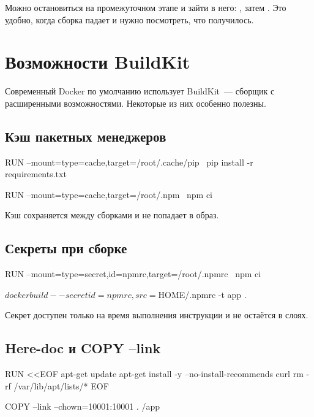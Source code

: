\begin{tipbox}
Можно остановиться на промежуточном этапе и зайти в него:
, затем
. Это удобно, когда сборка падает
и нужно посмотреть, что получилось.
\end{tipbox}

\section{Возможности BuildKit}

Современный Docker по умолчанию использует BuildKit~--- сборщик
с расширенными возможностями. Некоторые из них особенно полезны.

\subsection{Кэш пакетных менеджеров}

\begin{code}[language=dockerfile]
RUN --mount=type=cache,target=/root/.cache/pip \
    pip install -r requirements.txt

RUN --mount=type=cache,target=/root/.npm \
    npm ci
\end{code}

Кэш сохраняется между сборками и не попадает в образ.

\subsection{Секреты при сборке}

\begin{code}[language=dockerfile]
RUN --mount=type=secret,id=npmrc,target=/root/.npmrc \
    npm ci
\end{code}

\begin{code}[language=bash]
$ docker build --secret id=npmrc,src=$HOME/.npmrc -t app .
\end{code}

Секрет доступен только на время выполнения инструкции и не остаётся
в слоях.

\subsection{Here-doc и COPY --link}

\begin{code}[language=dockerfile]
RUN <<EOF
apt-get update
apt-get install -y --no-install-recommends curl
rm -rf /var/lib/apt/lists/*
EOF

COPY --link --chown=10001:10001 . /app
\end{code}

